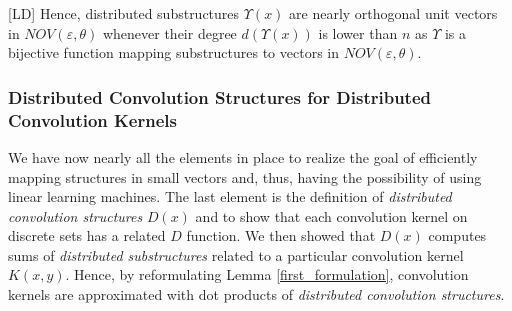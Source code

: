\documentclass[twoside,11pt]{article}
\def\vec#1{\mathbf{#1}}
\def\svec#1{\vec{#1}}
\def\degree#1{d(#1)}
\def\df{\Upsilon}
\def\mo{\odot}
\def\comment#1#2{}
\def\LD#1{[{\color{blue}L}D] {\color{blue}#1}}
\begin{document}

\LD{Hence,  distributed substructures $\df(x)$ are nearly orthogonal unit vectors in $NOV(\varepsilon,\theta)$ whenever their degree $\degree{\df(x)}$ is lower than $n$ as $\df$ is a bijective function mapping substructures to vectors in $NOV(\varepsilon,\theta)$.} 


\subsubsection{Distributed Convolution Structures for Distributed Convolution Kernels\comment{NEW}{}}
\label{sec:the_core_section}



We have now nearly all the elements in place to realize the %
goal of efficiently mapping structures in small vectors and, thus, having the possibility of using linear learning machines.
The last element is the definition of \emph{distributed convolution structures} $D(x)$ and to show that each convolution kernel on discrete sets has a related $D$ function. We then showed that $D(x)$ computes sums of \emph{distributed substructures} related to a particular convolution kernel $K(x,y)$. Hence, by reformulating Lemma \ref{first_formulation}, convolution kernels are approximated with dot products of \emph{distributed convolution structures}.
\end{document}

